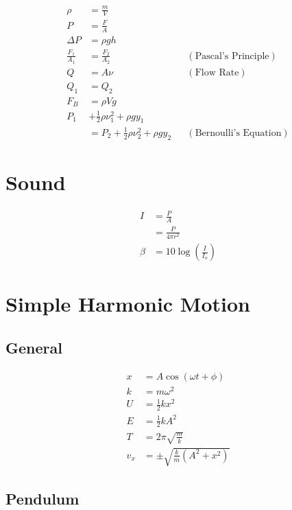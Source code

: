 \documentclass[10pt]{article}
\begin{document}
\begin{multicols*}{4}
\begin{align*}
    \rho &= \frac{m}{V}\\
    P &= \frac{F}{A}\\
    \Delta P &= \rho gh\\
    \frac{F_1}{A_1} &= \frac{F_2}{A_2} && (\text{Pascal's
	Principle})\\
    Q &= A\nu && (\text{Flow Rate})\\
    Q_1 &= Q_2\\
    F_B &= \rho Vg\\
    P_1 &+ \frac{1}{2}\rho \nu_1^2 + \rho gy_1\\
	&= P_2 + \frac{1}{2}\rho \nu_2^2 + \rho gy_2 &&
	(\text{Bernoulli's Equation})
\end{align*}

\section{Sound}

\begin{align*}
    I &= \frac{P}{A}\\
      &= \frac{P}{4\pi r^2}\\
    \beta &= 10 \log \left({\frac{I}{I_o}}\right)
\end{align*}

\section{Simple Harmonic Motion}
\vspace{2ex}
\subsection{General}

\begin{align*}
    x &= A \cos (\omega t + \phi)\\
    k &= m\omega^2\\
    U &= \tfrac{1}{2} kx^2\\
    E &= \tfrac{1}{2} kA^2\\
    T &= 2\pi \sqrt{\frac{m}{k}}\\
    v_x &= \pm \sqrt{\tfrac{k}{m} (A^2 + x^2)}
\end{align*}

\subsection{Pendulum}


\end{multicols*}
\end{document}
